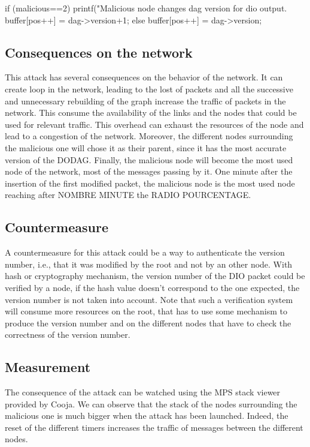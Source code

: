 \documentclass{report}
\begin{document}
\begin{myc}
if (malicious==2){
	printf("Malicious node changes dag version for dio output. %
	buffer[pos++] = dag->version+1;
} else {
	buffer[pos++] = dag->version;
}
\end{myc}

\subsection*{Consequences on the network}
This attack has several consequences on the behavior of the network. It can create loop in the network, leading to the lost of packets and all the successive and unnecessary rebuilding of the graph increase the traffic of packets in the network. This consume the availability of the links and the nodes that could be used for relevant traffic. This overhead can exhaust the resources of the node and lead to a congestion of the network. 
Moreover, the different nodes surrounding the malicious one will chose it as their parent, since it has the most accurate version of the DODAG.
Finally, the malicious node will become the most used node of the network, most of the messages passing by it. One minute after the insertion of the first modified packet, the malicious node is the most used node reaching after NOMBRE MINUTE the RADIO POURCENTAGE.
\subsection*{Countermeasure}
A countermeasure for this attack could be a way to authenticate the version number, i.e., that it was modified by the root and not by an other node. With hash or cryptography mechanism, the version number of the DIO packet could be verified by a node, if the hash value doesn't correspond to the one expected, the version number is not taken into account. Note that such a verification system will consume more resources on the root, that has to use some mechanism to produce the version number and on the different nodes that have to check the correctness of the version number.
\subsection*{Measurement }
The consequence of the attack can be watched using the MPS stack viewer provided by Cooja. We can observe that the stack of the nodes surrounding the malicious one is much bigger when the attack has been launched. Indeed, the reset of the different timers increases the traffic of messages between the different nodes.\\
\end{document}
